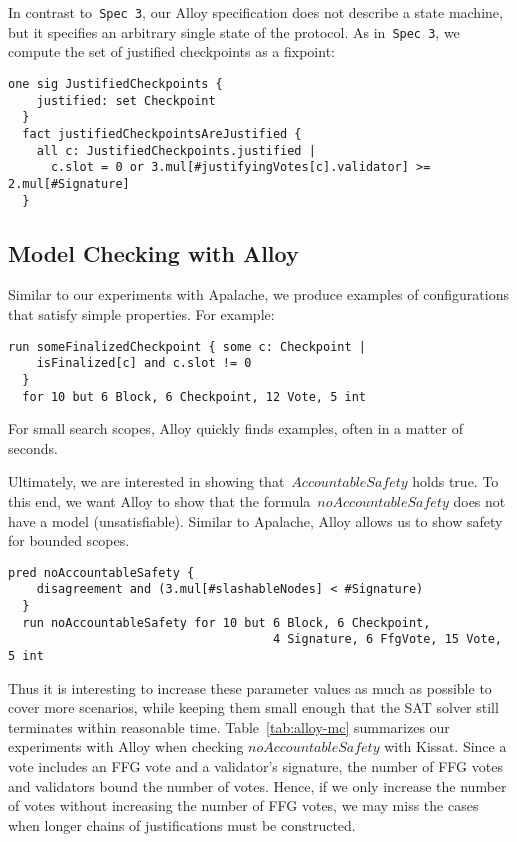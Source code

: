 In contrast to~\texttt{Spec 3}, our Alloy specification does not describe a
state machine, but it specifies an arbitrary single state of the protocol. As
in~\texttt{Spec 3}, we compute the set of justified checkpoints as a fixpoint:

\begin{lstlisting}[language=alloy,columns=fullflexible]
  one sig JustifiedCheckpoints {
    justified: set Checkpoint
  }
  fact justifiedCheckpointsAreJustified {
    all c: JustifiedCheckpoints.justified |
      c.slot = 0 or 3.mul[#justifyingVotes[c].validator] >= 2.mul[#Signature]
  }
\end{lstlisting}

\subsection{Model Checking with Alloy}

Similar to our experiments with Apalache, we produce examples of configurations
that satisfy simple properties. For example:

\begin{lstlisting}[language=alloy,columns=fullflexible]
  run someFinalizedCheckpoint { some c: Checkpoint |
    isFinalized[c] and c.slot != 0
  }
  for 10 but 6 Block, 6 Checkpoint, 12 Vote, 5 int
\end{lstlisting}

For small search scopes, Alloy quickly finds examples, often in a matter
of seconds.

Ultimately, we are interested in showing that~$\textit{AccountableSafety}$
holds true. To this end, we want Alloy to show that the
formula~$\textit{noAccountableSafety}$ does not have a model (unsatisfiable).
Similar to Apalache, Alloy allows us to show safety for bounded scopes.

\begin{lstlisting}[language=alloy,columns=fullflexible]
  pred noAccountableSafety {
    disagreement and (3.mul[#slashableNodes] < #Signature)
  }
  run noAccountableSafety for 10 but 6 Block, 6 Checkpoint,
                                     4 Signature, 6 FfgVote, 15 Vote, 5 int
\end{lstlisting}

Thus it is interesting to increase these parameter values as much as possible
to cover more scenarios, while keeping them small enough that the SAT solver
still terminates within reasonable time. Table~\ref{tab:alloy-mc} summarizes
our experiments with Alloy when checking $\textit{noAccountableSafety}$ with
Kissat.  Since a vote includes an FFG vote and a validator's signature, the
number of FFG votes and validators bound the number of votes. Hence, if we only
increase the number of votes without increasing the number of FFG votes, we may
miss the cases when longer chains of justifications must be constructed.

